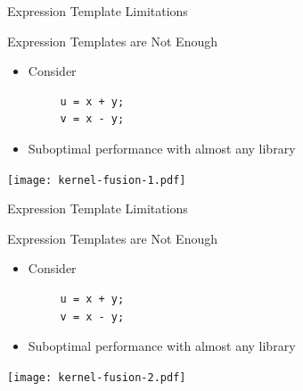 

\begin{frame}[fragile]{Expression Template Limitations}

 \begin{block}{Expression Templates are Not Enough}
  \begin{itemize}
   \item Consider
    \begin{lstlisting}
     u = x + y;
     v = x - y;
    \end{lstlisting}
   \item Suboptimal performance with almost any library
  \end{itemize}
 \end{block}
 
 \begin{center}
  \texttt{[image: kernel-fusion-1.pdf]}
 \end{center}


\end{frame}



\begin{frame}[fragile]{Expression Template Limitations}

 \begin{block}{Expression Templates are Not Enough}
  \begin{itemize}
   \item Consider
    \begin{lstlisting}
     u = x + y;
     v = x - y;
    \end{lstlisting}
   \item Suboptimal performance with almost any library
  \end{itemize}
 \end{block}
 
 \begin{center}
  \texttt{[image: kernel-fusion-2.pdf]}
 \end{center}


\end{frame}


